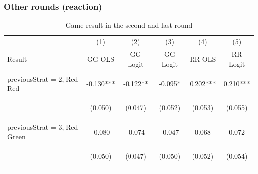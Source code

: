 \documentclass{article} %
\begin{document}
\subsubsection{Other rounds (reaction) }
\begin{table}[H]
\caption{Game result in the second and last round} \label{tab:last_coop}

\begin{center}
\begin{tabular}{lccccc} \hline
 & (1) & (2) & (3) & (4) & (5) \\
Result & GG OLS& GG Logit & GG Logit& RR OLS& RR Logit\\ \hline

\vspace{4pt} & \begin{footnotesize}\end{footnotesize} & \begin{footnotesize}\end{footnotesize} & \begin{footnotesize}\end{footnotesize} & \begin{footnotesize}\end{footnotesize} & \begin{footnotesize}\end{footnotesize} \\
previousStrat = 2, Red Red & -0.130*** & -0.122** & -0.095* & 0.202*** & 0.210*** \\
\vspace{4pt} & \begin{footnotesize}(0.050)\end{footnotesize} & \begin{footnotesize}(0.047)\end{footnotesize} & \begin{footnotesize}(0.052)\end{footnotesize} & \begin{footnotesize}(0.053)\end{footnotesize} & \begin{footnotesize}(0.055)\end{footnotesize} \\
previousStrat = 3, Red Green & -0.080 & -0.074 & -0.047 & 0.068 & 0.072 \\
\vspace{4pt} & \begin{footnotesize}(0.050)\end{footnotesize} & \begin{footnotesize}(0.047)\end{footnotesize} & \begin{footnotesize}(0.050)\end{footnotesize} & \begin{footnotesize}(0.052)\end{footnotesize} & \begin{footnotesize}(0.054)\end{footnotesize} \\

\end{tabular}
\end{center}
\end{table}
\end{document}
